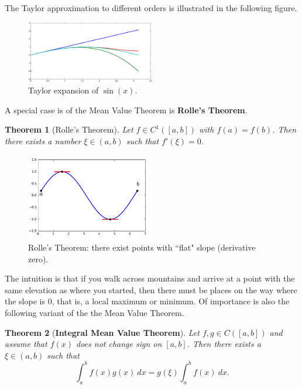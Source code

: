 \documentclass[11pt,a4paper]{memoir}
\newtheorem*{theorem*}{Theorem}
\begin{document}
The Taylor approximation to different orders is illustrated in the following figure.

\begin{center}
\begin{figure}[h!]
\centering
\includegraphics[width=0.5\textwidth]{images/sine-crop.pdf}
\caption{\small Taylor expansion of $\sin(x)$.}
\end{figure}
\end{center}

A special case is of the Mean Value Theorem is \textbf{Rolle's Theorem}.

\begin{theorem*}[Rolle's Theorem]
Let $f\in C^1([a,b])$ with $f(a) = f(b)$. Then there exists 
a number $\xi\in (a,b)$ such that $f'(\xi) = 0$.
\end{theorem*}

\begin{figure}[h!]
\centering
\includegraphics[width=0.5\textwidth]{images/rolle.pdf}
\caption{\small Rolle's Theorem: there exist points with ``flat" slope (derivative zero).}
\end{figure}

The intuition is that if you walk across mountains and arrive at a point with the same elevation as where you started, then there must be places on the way where the slope is $0$, that is, a local maximum or minimum. Of importance is also the following variant of the the Mean Value Theorem.

\begin{theorem*}[\textbf{Integral Mean Value Theorem}]
Let $f,g\in C([a,b])$ and assume that $f(x)$ does not change sign on $[a,b]$. Then
there exists a $\xi\in (a,b)$ such that
\begin{equation*}
  \int_a^b f(x)g(x) \ dx = g(\xi) \int_a^b f(x) \ dx.
\end{equation*}
\end{theorem*}
\end{document}
